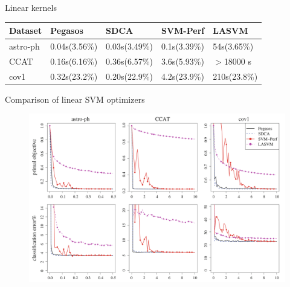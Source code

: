 \begin{frame}{Linear kernels}
\begin{table}[ht]
    \centering
    \begin{tabular}{lllll}
            \hline
            Dataset & Pegasos & SDCA & SVM-Perf & LASVM \\ \hline 
            astro-ph & 0.04s(3.56\%) & 0.03s(3.49\%) & 0.1s(3.39\%) & 54s(3.65\%) \\ 
            CCAT & 0.16s(6.16\%) & 0.36s(6.57\%) & 3.6s(5.93\%) & $>$18000 s  \\ 
            cov1 & 0.32s(23.2\%) & 0.20s(22.9\%) & 4.2s(23.9\%) & 210s(23.8\%) \\ \hline
        \end{tabular}
    \end{table}
\end{frame}

\begin{frame}{Comparison of linear SVM optimizers}
    \begin{figure}[htbp]
        \centering
        \includegraphics[height=0.7\textheight, width=\textwidth]{images/comp1.png}
    \end{figure}
\end{frame}

